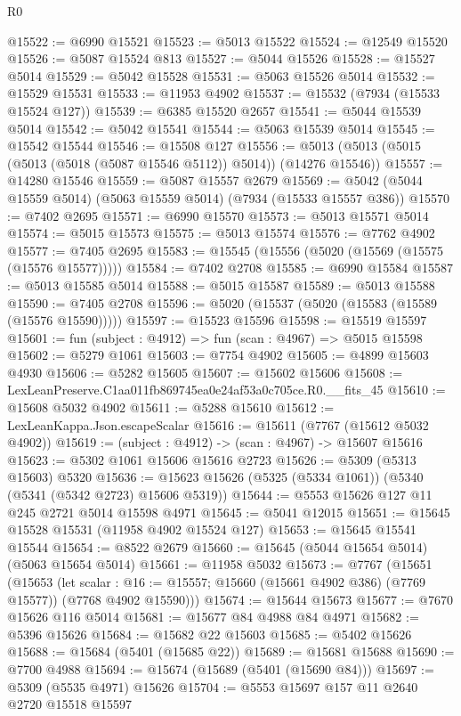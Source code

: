 \begin{lexlean}{R0}
\begin{coremodule}
@15522 := @6990 @15521
@15523 := @5013 @15522
@15524 := @12549 @15520
@15526 := @5087 @15524 @813
@15527 := @5044 @15526
@15528 := @15527 @5014
@15529 := @5042 @15528
@15531 := @5063 @15526 @5014
@15532 := @15529 @15531
@15533 := @11953 @4902
@15537 := @15532 (@7934 (@15533 @15524 @127))
@15539 := @6385 @15520 @2657
@15541 := @5044 @15539 @5014
@15542 := @5042 @15541
@15544 := @5063 @15539 @5014
@15545 := @15542 @15544
@15546 := @15508 @127
@15556 := @5013 (@5013 (@5015 (@5013 (@5018 (@5087 @15546 @5112)) @5014)) (@14276 @15546))
@15557 := @14280 @15546
@15559 := @5087 @15557 @2679
@15569 := @5042 (@5044 @15559 @5014) (@5063 @15559 @5014) (@7934 (@15533 @15557 @386))
@15570 := @7402 @2695
@15571 := @6990 @15570
@15573 := @5013 @15571 @5014
@15574 := @5015 @15573
@15575 := @5013 @15574
@15576 := @7762 @4902
@15577 := @7405 @2695
@15583 := @15545 (@15556 (@5020 (@15569 (@15575 (@15576 @15577)))))
@15584 := @7402 @2708
@15585 := @6990 @15584
@15587 := @5013 @15585 @5014
@15588 := @5015 @15587
@15589 := @5013 @15588
@15590 := @7405 @2708
@15596 := @5020 (@15537 (@5020 (@15583 (@15589 (@15576 @15590)))))
@15597 := @15523 @15596
@15598 := @15519 @15597
@15601 := fun (subject : @4912) => fun (scan : @4967) => @5015 @15598
@15602 := @5279 @1061
@15603 := @7754 @4902
@15605 := @4899 @15603 @4930
@15606 := @5282 @15605
@15607 := @15602 @15606
@15608 := LexLeanPreserve.C1aa011fb869745ea0e24af53a0c705ce.R0.__fits_45
@15610 := @15608 @5032 @4902
@15611 := @5288 @15610
@15612 := LexLeanKappa.Json.escapeScalar
@15616 := @15611 (@7767 (@15612 @5032 @4902))
@15619 := (subject : @4912) -> (scan : @4967) -> @15607 @15616
@15623 := @5302 @1061 @15606 @15616 @2723
@15626 := @5309 (@5313 @15603) @5320
@15636 := @15623 @15626 (@5325 (@5334 @1061)) (@5340 (@5341 (@5342 @2723) @15606 @5319))
@15644 := @5553 @15626 @127 @11 @245 @2721 @5014 @15598 @4971
@15645 := @5041 @12015
@15651 := @15645 @15528 @15531 (@11958 @4902 @15524 @127)
@15653 := @15645 @15541 @15544
@15654 := @8522 @2679
@15660 := @15645 (@5044 @15654 @5014) (@5063 @15654 @5014)
@15661 := @11958 @5032
@15673 := @7767
    (@15651
      (@15653
        (let scalar : @16 := @15557; @15660 (@15661 @4902 @386) (@7769 @15577))
        (@7768 @4902 @15590)))
@15674 := @15644 @15673
@15677 := @7670 @15626 @116 @5014
@15681 := @15677 @84 @4988 @84 @4971
@15682 := @5396 @15626
@15684 := @15682 @22 @15603
@15685 := @5402 @15626
@15688 := @15684 (@5401 (@15685 @22))
@15689 := @15681 @15688
@15690 := @7700 @4988
@15694 := @15674 (@15689 (@5401 (@15690 @84)))
@15697 := @5309 (@5535 @4971) @15626
@15704 := @5553 @15697 @157 @11 @2640 @2720 @15518 @15597

\end{coremodule}
\end{lexlean}
